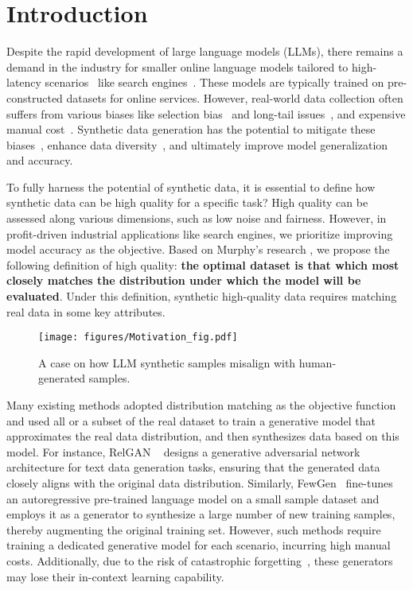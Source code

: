 
\section{Introduction}
Despite the rapid development of large language models (LLMs), there remains a demand in the industry for smaller online language models tailored to high-latency scenarios~\cite{hsieh2023distilling, jia2024erase, wang2023single, du2024lightcs, du2024tutorial, zhao2024retrievable, dai2023uncovering, dai2024modeling} like search engines~\cite{khattab2020colbert}. These models are typically trained on pre-constructed datasets for online services. 
However, real-world data collection often suffers from various biases like selection bias~\cite{wang2020exposure, arora2022exposure, dai2023dually} and long-tail issues~\cite{dai2023long, wu2008information}, and expensive manual cost~\cite{daniel2018quality, dai2024cocktail}. Synthetic data generation has the potential to mitigate these biases~\cite{shahul2024bias, lyu2022semi}, enhance data diversity~\cite{feng2020genaug}, and ultimately improve model generalization and accuracy.

To fully harness the potential of synthetic data, it is essential to define how synthetic data can be high quality for a specific task? High quality can be assessed along various dimensions, such as low noise and fairness. However, in profit-driven industrial applications like search engines, we prioritize improving model accuracy as the objective. Based on Murphy’s research \cite{murphy2012machine}, we propose the following definition of high quality: \textbf{the optimal dataset is that which most closely matches the distribution under which the model will be evaluated}. Under this definition, synthetic high-quality data requires matching real data in some key attributes.

\begin{figure}[!t]
  \centering
    \texttt{[image: figures/Motivation\_fig.pdf]}
  \caption{A case on how LLM synthetic samples misalign with human-generated samples.}
  \vspace{-0.15in}
  \label{fig.motivation}
  \Description{}
\end{figure}


Many existing methods adopted distribution matching as the objective function and used all or a subset of the real dataset to train a generative model that approximates the real data distribution, and then synthesizes data based on this model. For instance, RelGAN ~\cite{RelGAN} designs a generative adversarial network architecture for text data generation tasks, ensuring that the generated data closely aligns with the original data distribution. Similarly, FewGen~\cite{fewgen} fine-tunes an autoregressive pre-trained language model on a small sample dataset and employs it as a generator to synthesize a large number of new training samples, thereby augmenting the original training set. However, such methods require training a dedicated generative model for each scenario, incurring high manual costs. Additionally, due to the risk of catastrophic forgetting~\cite{ramasesh2021effect}, these generators may lose their in-context learning capability. 

